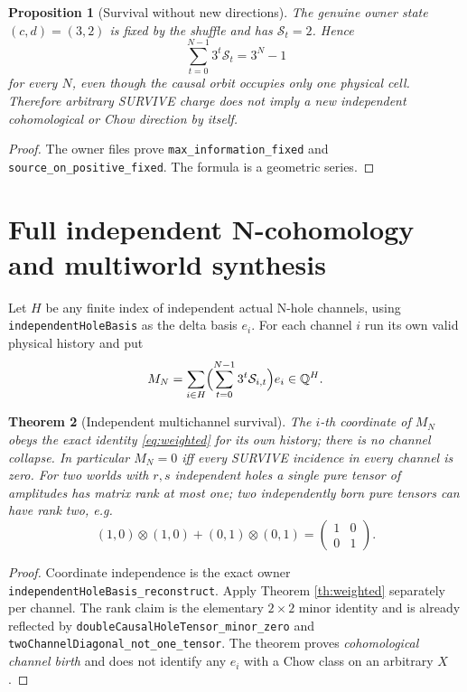 \documentclass[11pt]{article}
\newtheorem{theorem}{Theorem}[section]
\newtheorem{proposition}[theorem]{Proposition}
\newcommand{\Q}{\mathbb Q}
\begin{document}
\begin{proposition}[Survival without new directions]
The genuine owner state \((c,d)=(3,2)\) is fixed by the
shuffle and has \(\mathcal S_t=2\). Hence
\[
\sum_{t=0}^{N-1}3^t\mathcal S_t=3^N-1
\]
for every \(N\), even though the causal orbit occupies \emph{only
one physical cell}. Therefore arbitrary SURVIVE charge does not imply
a new independent cohomological or Chow direction by itself.
\end{proposition}
\begin{proof}
The owner files prove \texttt{max\_information\_fixed}
and \texttt{source\_on\_positive\_fixed}. The formula is a geometric series.
\end{proof}

\section{Full independent N-cohomology and multiworld synthesis}

Let \(H\) be any finite index of independent actual N-hole channels,
using \texttt{independentHoleBasis} as the delta basis \(e_i\).
For each channel \(i\) run its own valid physical history and put
\[
M_N=\sum_{i\in H}\Bigl(\sum_{t=0}^{N-1}3^t\mathcal S_{i,t}\Bigr)e_i
 \in\Q^H.
\]
\begin{theorem}[Independent multichannel survival]
The \(i\)-th coordinate of \(M_N\) obeys the exact
identity \eqref{eq:weighted} for its own history; there is no channel
collapse. In particular \(M_N=0\) iff every SURVIVE
incidence in every channel is zero.
For two worlds with \(r,s\) independent holes a single pure tensor
of amplitudes has matrix rank at most one; two independently born
pure tensors can have rank two, e.g.
\[
(1,0)\otimes(1,0)+(0,1)\otimes(0,1)
=\begin{pmatrix}1&0\\0&1\end{pmatrix}.
\]
\end{theorem}
\begin{proof}
Coordinate independence is the exact owner
\texttt{independentHoleBasis\_reconstruct}.
Apply Theorem \ref{th:weighted} separately per channel.
The rank claim is the elementary \(2\times2\) minor identity and
is already reflected by \texttt{doubleCausalHoleTensor\_minor\_zero}
and \texttt{twoChannelDiagonal\_not\_one\_tensor}.
The theorem proves \emph{cohomological channel birth} and
does not identify any \(e_i\) with a Chow class on an arbitrary \(X\).
\end{proof}
\end{document}
